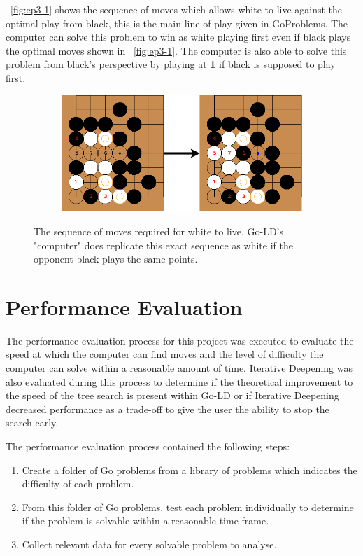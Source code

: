 \documentclass{l4proj}
\newcommand{\bo}[1]{\textbf{#1}}
\begin{document}
~\autoref{fig:ep3-1} shows the sequence of moves which allows white to live against the optimal play from black, this is the main line of play given in GoProblems. The computer can solve this problem to win as white playing first even if black plays the optimal moves shown in ~\autoref{fig:ep3-1}. The computer is also able to solve this problem from black's perspective by playing at \bo{1} if black is supposed to play first.





\begin{figure}[!ht]
\centering
\begin{subfigure}[b]{0.70\textwidth}
\centering
\includegraphics[width=\textwidth]{ep3/ep3-1.png}
\end{subfigure}
\caption{The sequence of moves required for white to live. Go-LD's "computer" does replicate this exact sequence as white if the opponent black plays the same points.}
\label{fig:ep3-1}
\end{figure}

\section{Performance Evaluation}

The performance evaluation process for this project was executed to evaluate the speed at which the computer can find moves and the level of difficulty the computer can solve within a reasonable amount of time. Iterative Deepening was also evaluated during this process to determine if the theoretical improvement to the speed of the tree search is present within Go-LD or if Iterative Deepening decreased performance as a trade-off to give the user the ability to stop the search early.

The performance evaluation process contained the following steps:
\begin{enumerate}
\item Create a folder of Go problems from a library of problems which indicates the difficulty of each problem.
\item From this folder of Go problems, test each problem individually to determine if the problem is solvable within a reasonable time frame.
\item  Collect relevant data for every solvable problem to analyse.
\end{enumerate}
\end{document}
